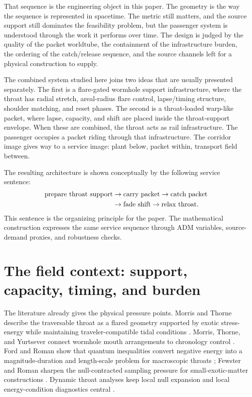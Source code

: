 \documentclass[11pt]{article}
\begin{document}
That sequence is the engineering object in this paper. The geometry is the way the sequence is represented in spacetime. The metric still matters, and the source support still dominates the feasibility problem, but the passenger system is understood through the work it performs over time. The design is judged by the quality of the packet worldtube, the containment of the infrastructure burden, the ordering of the catch/release sequence, and the source channels left for a physical construction to supply.

The combined system studied here joins two ideas that are usually presented separately. The first is a flare-gated wormhole support infrastructure, where the throat has radial stretch, areal-radius flare control, lapse/timing structure, shoulder matching, and reset phases. The second is a throat-loaded warp-like packet, where lapse, capacity, and shift are placed inside the throat-support envelope. When these are combined, the throat acts as rail infrastructure. The passenger occupies a packet riding through that infrastructure. The corridor image gives way to a service image: plant below, packet within, transport field between.

The resulting architecture is shown conceptually by the following service sentence:
\begin{equation}
\begin{aligned}
\hbox{prepare throat support}&\rightarrow\hbox{carry packet}\rightarrow\hbox{catch packet}\\
&\rightarrow\hbox{fade shift}\rightarrow\hbox{relax throat}.
\end{aligned}
\label{eq:service_sentence}
\end{equation}
This sentence is the organizing principle for the paper. The mathematical construction expresses the same service sequence through ADM variables, source-demand proxies, and robustness checks.

\section{The field context: support, capacity, timing, and burden}

The literature already gives the physical pressure points. Morris and Thorne describe the traversable throat as a flared geometry supported by exotic stress-energy while maintaining traveler-compatible tidal conditions \citep{morris_thorne_1988}. Morris, Thorne, and Yurtsever connect wormhole mouth arrangements to chronology control \citep{morris_thorne_yurtsever_1988}. Ford and Roman show that quantum inequalities convert negative energy into a magnitude-duration and length-scale problem for macroscopic throats \citep{ford_roman_1996}; Fewster and Roman sharpen the null-contracted sampling pressure for small-exotic-matter constructions \citep{fewster_roman_2005}. Dynamic throat analyses keep local null expansion and local energy-condition diagnostics central \citep{hochberg_visser_1998}.
\end{document}
